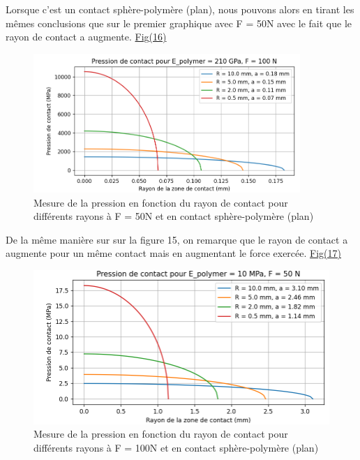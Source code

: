 \documentclass[a4paper,12pt]{article}
\begin{document}
Lorsque c'est un contact sphère-polymère (plan), nous pouvons alors en tirant les mêmes conclusions que sur le premier graphique avec F = 50N avec le fait que le rayon de contact a augmente. \hyperref[fig:mon_image16]{Fig(16)}
\begin{figure}[H] 
	\centering
	\includegraphics[width=0.9\textwidth]{pre2.png} 
	\caption{Mesure de la pression en fonction du rayon de contact pour différents rayons à F = 50N et en contact sphère-polymère (plan)} 
	\label{fig:mon_image16} 
\end{figure}
\clearpage
De la même manière sur sur la figure 15, on remarque que le rayon de contact a augmente pour un même contact mais en augmentant le force exercée. \hyperref[fig:mon_image17]{Fig(17)}
\begin{figure}[H] 
	\centering
	\includegraphics[width=1\textwidth]{pre3.png} 
	\caption{Mesure de la pression en fonction du rayon de contact pour différents rayons à F = 100N et en contact sphère-polymère (plan)} 
	\label{fig:mon_image17} 
\end{figure}
\end{document}
